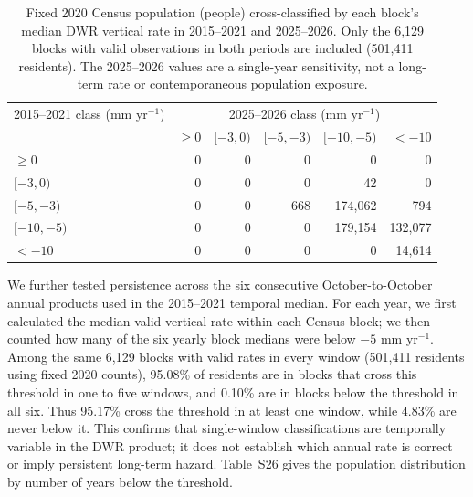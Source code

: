 \documentclass[10pt,a4paper]{article}
\begin{document}
\begin{table}[htbp]\centering\small
\caption{Fixed 2020 Census population (people) cross-classified by each block's median DWR vertical rate in 2015--2021 and 2025--2026. Only the 6,129 blocks with valid observations in both periods are included (501,411 residents). The 2025--2026 values are a single-year sensitivity, not a long-term rate or contemporaneous population exposure.}
\begin{tabular}{lrrrrr}\toprule
\shortstack{2015--2021 class\\(mm yr$^{-1}$)} & \multicolumn{5}{c}{2025--2026 class (mm yr$^{-1}$)} \\
 & $\geq0$ & $[-3,0)$ & $[-5,-3)$ & $[-10,-5)$ & $<-10$ \\
\midrule
$\geq0$ & 0 & 0 & 0 & 0 & 0 \\
$[-3,0)$ & 0 & 0 & 0 & 42 & 0 \\
$[-5,-3)$ & 0 & 0 & 668 & 174,062 & 794 \\
$[-10,-5)$ & 0 & 0 & 0 & 179,154 & 132,077 \\
$<-10$ & 0 & 0 & 0 & 0 & 14,614 \\
\bottomrule\end{tabular}
\end{table}

We further tested persistence across the six consecutive October-to-October annual products used in the 2015--2021 temporal median. For each year, we first calculated the median valid vertical rate within each Census block; we then counted how many of the six yearly block medians were below $-5$ mm yr$^{-1}$. Among the same 6,129 blocks with valid rates in every window (501,411 residents using fixed 2020 counts), 95.08\% of residents are in blocks that cross this threshold in one to five windows, and 0.10\% are in blocks below the threshold in all six. Thus 95.17\% cross the threshold in at least one window, while 4.83\% are never below it. This confirms that single-window classifications are temporally variable in the DWR product; it does not establish which annual rate is correct or imply persistent long-term hazard. Table~S26 gives the population distribution by number of years below the threshold.
\end{document}
